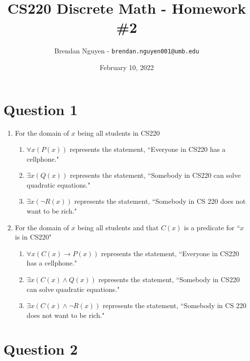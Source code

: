\documentclass[letterpaper, 12pt]{article}
\title{CS220 Discrete Math - Homework \#2}
\author{Brendan Nguyen - \texttt{brendan.nguyen001@umb.edu}}
\date{February 10, 2022}
\begin{document}
\maketitle

\section*{Question 1}

\begin{enumerate}
    \item For the domain of $x$ being all students in CS220
    \begin{enumerate}
        \item $\forall x(P(x))$ represents the statement, ``Everyone in CS220 has a cellphone."
        \item $\exists x(Q(x))$ represents the statement, ``Somebody in CS220 can solve quadratic equations."
        \item $\exists x(\neg R(x))$ represents the statement, ``Somebody in CS 220 does not want to be rich."
    \end{enumerate}
    \item For the domain of $x$ being all students and that $C(x)$ is a predicate for ``$x$ is in CS220" 
    \begin{enumerate}
        \item $\forall x(C(x) \to P(x))$ represents the statement, ``Everyone in CS220 has a cellphone."
        \item $\exists x(C(x) \land Q(x))$ represents the statement, ``Somebody in CS220 can solve quadratic equations."
        \item $\exists x(C(x) \land \neg R(x))$ represents the statement, ``Somebody in CS 220 does not want to be rich."
    \end{enumerate}
\end{enumerate}

\section*{Question 2}
\end{document}
